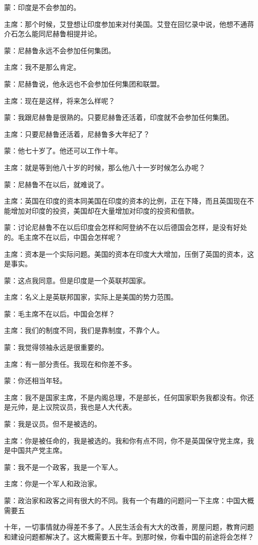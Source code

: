 蒙：印度是不会参加的。

主席：那个时候，艾登想让印度参加来对付美国。艾登在回忆录中说，他想不通蒋介石怎么能同尼赫鲁相提并论。

蒙：尼赫鲁永远不会参加任何集团。

主席：我不是那么肯定。

蒙：尼赫鲁说，他永远也不会参加任何集团和联盟。

主席：现在是这样，将来怎么样呢？

蒙：我跟尼赫鲁是很熟的。只要尼赫鲁还活着，印度就不会参加任何集团。

主席：只要尼赫鲁还活着，尼赫鲁多大年纪了？

蒙：他七十岁了。他还可以工作十年。

主席：就是等到他八十岁的时候，那么他八十一岁时候怎么办呢？

蒙：尼赫鲁不在以后，就难说了。

主席：英国在印度的资本同美国在印度的资本的比例，正在下降，而且英国现在不能增加对印度的投资，美国却在大量增加对印度的投资和借款。

蒙：讨论尼赫鲁不在以后印度会怎样和阿登纳不在以后德国会怎样，是没有好处的。毛主席不在以后，中国会怎样呢？

主席：资本是一个实际问题。美国的资本在印度大大增加，压倒了英国的资本，这是事实。

蒙：这点我同意。但是印度是一个英联邦国家。

主席：名义上是英联邦国家，实际上是美国的势力范围。

蒙：毛主席不在以后。中国会怎样？

主席：我们的制度不同，我们是靠制度，不靠个人。

蒙：我觉得领袖永远是很重要的。

主席：有一部分责任。我现在和你差不多。

蒙：你还相当年轻。

主席：我不是国家主席，不是内阁总理，不是部长，任何国家职务我都没有。你还是元帅，是上议院议员，我也是人大代表。

蒙：我是议员。但不是被选的。

主席：你是被任命的，我是被选的。我和你有点不同，你不是英国保守党主席，我是中国共产党主席。

蒙：我不是一个政客，我是一个军人。

主席：你是一个军人和政治家。

蒙：政治家和政客之间有很大的不同。我有一个有趣的问题问一下主席：中国大概需要五

十年，一切事情就办得差不多了。人民生活会有大大的改善，房屋问题，教育问题和建设问题都解决了。这大概需要五十年。到那时候，你看中国的前途将会怎样？

